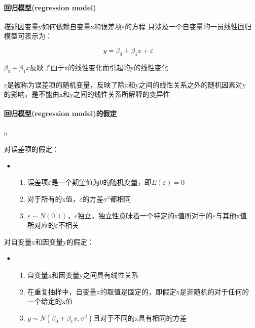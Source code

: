 \documentclass[UTF8,10pt]{book}
\begin{document}
{\paragraph{回归模型(regression model)	}描述因变量y如何依赖自变量x和误差项$\varepsilon$的方程 只涉及一个自变量的一员线性回归模型可表示为： 

$$y = \beta_0 + \beta_1 x+ \varepsilon$$ 

$\beta_0 + \beta_1 x$反映了由于x的线性变化而引起的y的线性变化 

$\varepsilon$是被称为误差项的随机变量，反映了除x和y之间的线性关系之外的随机因素对y的影响，是不能由x和y之间的线性关系所解释的变异性

\paragraph{回归模型(regression model)的假定	}a

对误差项的假定：


\begin{itemize}
	\item [] {
		\begin{enumerate}
			\item 误差项$\varepsilon$是一个期望值为0的随机变量，即$E(\varepsilon)=0$
			\item 对于所有的x值，$\varepsilon$的方差$\sigma^2$都相同
			\item $\varepsilon \sim N(0,1) $，$\varepsilon$独立，独立性意味着一个特定的x值所对于的$\varepsilon$与其他x值所对应的$\varepsilon$不相关 
			
		\end{enumerate}
	}
\end{itemize}

对自变量x和因变量y的假定：





\begin{itemize}
	\item [] {
		\begin{enumerate}
			\item 自变量x和因变量y之间具有线性关系
			\item 在重复抽样中，自变量x的取值是固定的，即假定x是非随机的对于任何的一个给定的x值			
			\item $y \sim N(\beta_0 + \beta_1 x ,\sigma^2) $且对于不同的x具有相同的方差
			
		\end{enumerate}
	}
\end{itemize}

}
\end{document}
